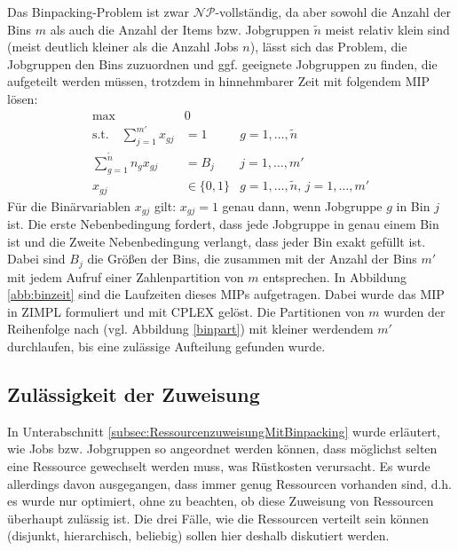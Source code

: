 \documentclass{scrreprt}
\begin{document}
Das Binpacking-Problem ist zwar $\mathcal{NP}$-vollständig, da aber sowohl die Anzahl der Bins $m$ 
als auch die Anzahl der Items bzw. Jobgruppen $\tilde{n}$ meist relativ klein sind (meist deutlich kleiner als die Anzahl Jobs $n$),
lässt sich das Problem, die Jobgruppen den Bins zuzuordnen und ggf. geeignete Jobgruppen zu finden, die aufgeteilt werden müssen, 
trotzdem in hinnehmbarer Zeit mit folgendem MIP lösen: 
\begin{align}
    \text{max} \quad &0 \\
    \text{s.t.}\quad \sum_{j=1}^{m'} x_{gj} &= 1 &g=1,\ldots,\tilde{n}\\
    \sum_{g=1}^{\tilde{n}} n_g x_{gj} &= B_j &j=1,\ldots,m' \\
    x_{gj} &\in \{0,1\} &g=1,\ldots,\tilde{n}, \, j=1,\ldots,m'
\end{align}
Für die Binärvariablen $x_{gj}$ gilt: $x_{gj}=1$ genau dann, wenn Jobgruppe $g$ in Bin $j$ ist.
Die erste Nebenbedingung fordert, dass jede Jobgruppe in genau einem Bin ist 
und die Zweite Nebenbedingung verlangt, dass jeder Bin exakt gefüllt ist.
Dabei sind $B_j$ die Größen der Bins, die zusammen mit der Anzahl der Bins $m'$ mit jedem Aufruf einer Zahlenpartition von $m$ entsprechen.
In Abbildung \ref{abb:binzeit} sind die Laufzeiten dieses MIPs aufgetragen.
Dabei wurde das MIP in ZIMPL formuliert und mit CPLEX gelöst.
Die Partitionen von $m$ wurden der Reihenfolge nach (vgl. Abbildung \ref{binpart}) mit kleiner werdendem $m'$ durchlaufen,
bis eine zulässige Aufteilung gefunden wurde.


\subsection{Zulässigkeit der Zuweisung}
\label{subsec:ZulaessigkeitDerZuweisung}
In Unterabschnitt \ref{subsec:RessourcenzuweisungMitBinpacking} wurde erläutert, wie Jobs bzw. Jobgruppen so angeordnet werden können,
dass möglichst selten eine Ressource gewechselt werden muss, was Rüstkosten verursacht.
Es wurde allerdings davon ausgegangen, dass immer genug Ressourcen vorhanden sind,
d.h. es wurde nur optimiert, ohne zu beachten, ob diese Zuweisung von Ressourcen überhaupt zulässig ist.
Die drei Fälle, wie die Ressourcen verteilt sein können (disjunkt, hierarchisch, beliebig) sollen hier deshalb diskutiert werden.
\end{document}
